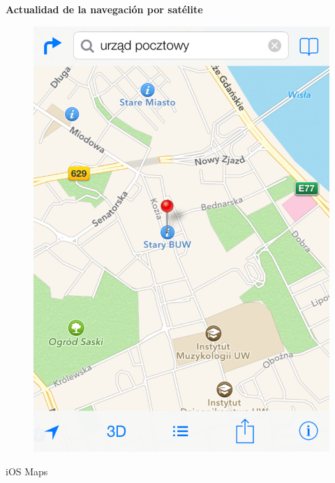 \begin{slide}
\begin{block}{\textbf{Actualidad de la navegación por satélite}}
\begin{center}
\begin{minipage}[b]{0.3\linewidth}
      \begin{center}
        \begin{figure}
          \includegraphics[height=0.6\textheight]{img/iosmaps.png}
        \end{figure}
        iOS Maps
      \end{center}
    \end{minipage}
    \begin{minipage}[b]{0.3\linewidth}
      \begin{center}
        \begin{figure}

\end{figure}
\end{center}
\end{minipage}
\end{center}
\end{block}
\end{slide}
